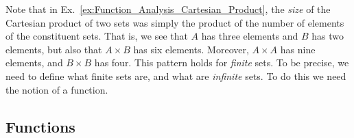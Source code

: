 \documentclass[crop=false,class=book,oneside]{standalone}
\begin{document}
            Note that in
            Ex.~\ref{ex:Function_Analysis_Cartesian_Product}, the
            \textit{size} of the Cartesian product of two sets
            was simply the product of the number of elements of
            the constituent sets. That is, we see that $A$ has
            three elements and $B$ has two elements, but also that
            $A\times{B}$ has six elements. Moreover, $A\times{A}$
            has nine elements, and $B\times{B}$ has four. This
            pattern holds for \textit{finite} sets. To be precise,
            we need to define what finite sets are, and what
            are \textit{infinite} sets. To do this we need the
            notion of a function.
        \subsection{Functions}
\end{document}
